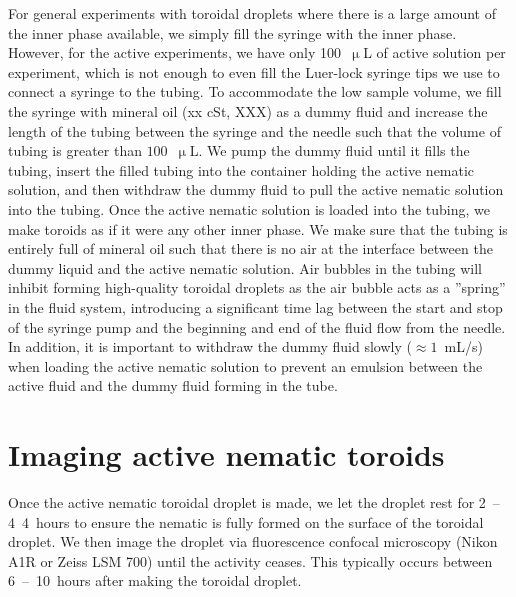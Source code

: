 For general experiments with toroidal droplets where there is a large amount of the inner phase available, we simply fill the syringe with the inner phase.
However, for the active experiments, we have only 100~$\upmu$L of active solution per experiment, which is not enough to even fill the Luer-lock syringe tips we use to connect a syringe to the tubing.
To accommodate the low sample volume, we fill the syringe with mineral oil (xx cSt, XXX) as a dummy fluid and increase the length of the tubing between the syringe and the needle such that the volume of tubing is greater than $100$~$\upmu$L.
We pump the dummy fluid until it fills the tubing, insert the filled tubing into the container holding the active nematic solution, and then withdraw the dummy fluid to pull the active nematic solution into the tubing.
Once the active nematic solution is loaded into the tubing, we make toroids as if it were any other inner phase.
We make sure that the tubing is entirely full of mineral oil such that there is no air at the interface between the dummy liquid and the active nematic solution.
Air bubbles in the tubing will inhibit forming high-quality toroidal droplets as the air bubble acts as a ''spring'' in the fluid system, introducing a significant time lag between the start and stop of the syringe pump and the beginning and end of the fluid flow from the needle.
In addition, it is important to withdraw the dummy fluid slowly ($\approx 1$~mL/s) when loading the active nematic solution to prevent an emulsion between the active fluid and the dummy fluid forming in the tube.




\section{Imaging active nematic toroids}
Once the active nematic toroidal droplet is made, we let the droplet rest for 2~--4~4~hours to ensure the nematic is fully formed on the surface of the toroidal droplet.
We then image the droplet via fluorescence confocal microscopy (Nikon A1R or Zeiss LSM 700) until the activity ceases.
This typically occurs between 6~--~10~hours after making the toroidal droplet.


